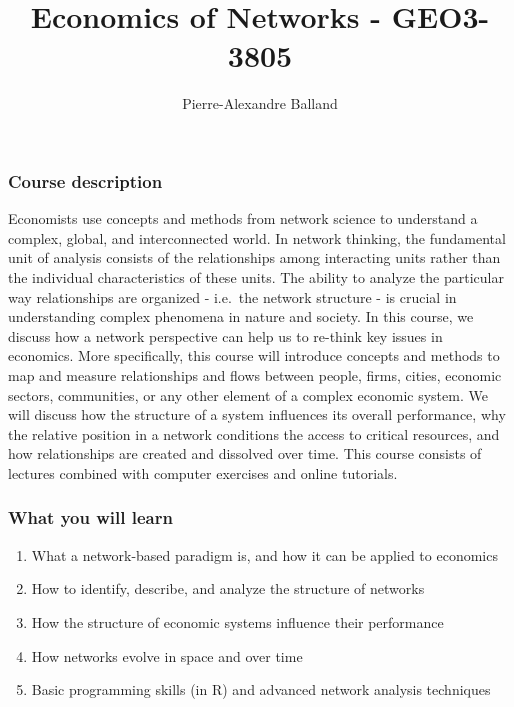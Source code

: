\documentclass[
]{article}
\title{Economics of Networks - GEO3-3805}
\author{Pierre-Alexandre Balland}
\date{}
\providecommand{\tightlist}{%
  \setlength{\itemsep}{0pt}\setlength{\parskip}{0pt}}
\begin{document}
\maketitle

\hypertarget{course-description}{%
\subsubsection{Course description}\label{course-description}}

Economists use concepts and methods from network science to understand a
complex, global, and interconnected world. In network thinking, the
fundamental unit of analysis consists of the relationships among
interacting units rather than the individual characteristics of these
units. The ability to analyze the particular way relationships are
organized - i.e.~the network structure - is crucial in understanding
complex phenomena in nature and society. In this course, we discuss how
a network perspective can help us to re-think key issues in economics.
More specifically, this course will introduce concepts and methods to
map and measure relationships and flows between people, firms, cities,
economic sectors, communities, or any other element of a complex
economic system. We will discuss how the structure of a system
influences its overall performance, why the relative position in a
network conditions the access to critical resources, and how
relationships are created and dissolved over time. This course consists
of lectures combined with computer exercises and online tutorials.

\hypertarget{what-you-will-learn}{%
\subsubsection{What you will learn}\label{what-you-will-learn}}

\begin{enumerate}
\def\labelenumi{\arabic{enumi}.}
\tightlist
\item
  What a network-based paradigm is, and how it can be applied to
  economics
\item
  How to identify, describe, and analyze the structure of networks
\item
  How the structure of economic systems influence their performance
\item
  How networks evolve in space and over time
\item
  Basic programming skills (in R) and advanced network analysis
  techniques
\end{enumerate}
\end{document}
